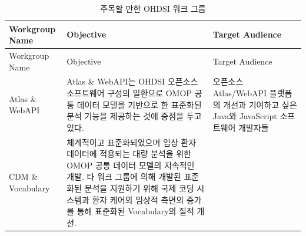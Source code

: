 \documentclass[11pt]{book}
\theoremstyle{definition}
\theoremstyle{definition}
\theoremstyle{definition}
\theoremstyle{remark}
\begin{document}
\begin{longtable}[]{@{}lll@{}}
\caption{\label{tab:OHDSIworkgroups} 주목할 만한 OHDSI 워크
그룹}\tabularnewline
\toprule
\begin{minipage}[b]{0.09\columnwidth}\raggedright\strut
Workgroup Name\strut
\end{minipage} & \begin{minipage}[b]{0.46\columnwidth}\raggedright\strut
Objective\strut
\end{minipage} & \begin{minipage}[b]{0.37\columnwidth}\raggedright\strut
Target Audience\strut
\end{minipage}\tabularnewline
\midrule
\endfirsthead
\toprule
\begin{minipage}[b]{0.09\columnwidth}\raggedright\strut
Workgroup Name\strut
\end{minipage} & \begin{minipage}[b]{0.46\columnwidth}\raggedright\strut
Objective\strut
\end{minipage} & \begin{minipage}[b]{0.37\columnwidth}\raggedright\strut
Target Audience\strut
\end{minipage}\tabularnewline
\midrule
\endhead
\begin{minipage}[t]{0.09\columnwidth}\raggedright\strut
Atlas \& WebAPI\strut
\end{minipage} & \begin{minipage}[t]{0.46\columnwidth}\raggedright\strut
Atlas \& WebAPI는 OHDSI 오픈소스 소프트웨어 구성의 일환으로 OMOP 공통
데이터 모델을 기반으로 한 표준화된 분석 기능을 제공하는 것에 중점을 두고
있다.\strut
\end{minipage} & \begin{minipage}[t]{0.37\columnwidth}\raggedright\strut
오픈소스 Atlas/WebAPI 플랫폼의 개선과 기여하고 싶은 Java와 JavaScript
소프트웨어 개발자들\strut
\end{minipage}\tabularnewline
\begin{minipage}[t]{0.09\columnwidth}\raggedright\strut
CDM \& Vocabulary\strut
\end{minipage} & \begin{minipage}[t]{0.46\columnwidth}\raggedright\strut
체계적이고 표준화되었으며 임상 환자 데이터에 적용되는 대량 분석을 위한
OMOP 공통 데이터 모델의 지속적인 개발. 타 워크 그룹에 의해 개발된
표준화된 분석을 지원하기 위해 국제 코딩 시스템과 환자 케어의 임상적
측면의 증가를 통해 표준화된 Vocabulary의 질적 개선.\strut
\end{minipage} & \begin{minipage}[t]{0.37\columnwidth}\raggedright\strut

\end{minipage}
\end{longtable}
\end{document}
